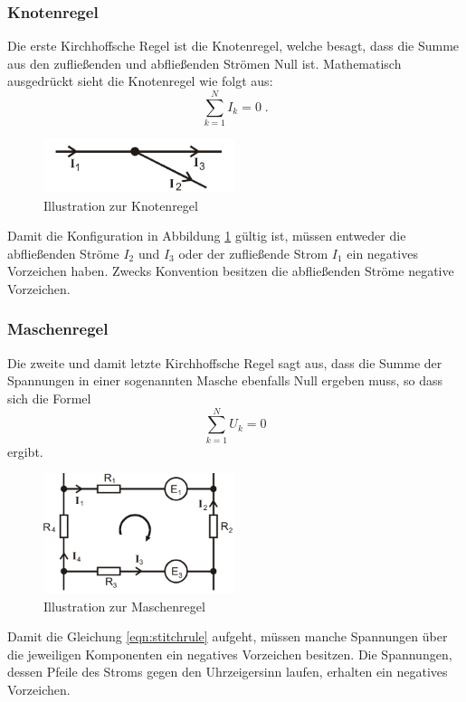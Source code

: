 \subsubsection{Knotenregel}
Die erste Kirchhoffsche Regel ist die Knotenregel, welche besagt, dass die Summe aus den zufließenden und abfließenden Strömen Null ist.
Mathematisch ausgedrückt sieht die Knotenregel wie folgt aus:
\begin{equation}
    \sum_{k=1}^N I_k = 0 \label{eqn:knotrule} \; \text{.}
\end{equation} 
\begin{figure}
    \centering
    \caption{Illustration zur Knotenregel}
    \label{fig:knotrule}
    \includegraphics[width = 0.5\textwidth]{bridges/knotrule.png}
\end{figure}
Damit die Konfiguration in Abbildung \ref{fig:knotrule} gültig ist, müssen entweder die abfließenden Ströme $I_2$ und $I_3$ oder 
der zufließende Strom $I_1$ ein negatives Vorzeichen haben. 
Zwecks Konvention besitzen die abfließenden Ströme negative Vorzeichen.
\subsubsection{Maschenregel}
Die zweite und damit letzte Kirchhoffsche Regel sagt aus, dass die Summe der Spannungen in einer sogenannten Masche ebenfalls Null ergeben muss, so dass sich die Formel
\begin{equation}
    \sum_{k=1}^N U_k = 0 \label{eqn:stitchrule}
\end{equation}
ergibt.
\begin{figure}
    \centering
    \caption{Illustration zur Maschenregel}
    \label{fig:stitchrule}
    \includegraphics[width=0.5\textwidth]{bridges/stitchrule.png}
\end{figure}
Damit die Gleichung \eqref{eqn:stitchrule} aufgeht, müssen manche Spannungen über die jeweiligen Komponenten ein negatives Vorzeichen besitzen.
Die Spannungen, dessen Pfeile des Stroms gegen den Uhrzeigersinn laufen, erhalten ein negatives Vorzeichen.
